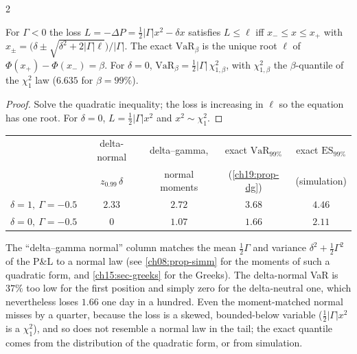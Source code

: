 \begin{paracol}{2}
\begin{proposition}\label{ch19:prop-dg}
For $\Gamma<0$ the loss $L=-\Delta P=\tfrac12|\Gamma|x^2-\delta x$ satisfies $L\le\ell$ iff $x_-\le x\le x_+$ with $x_\pm=\bigl(\delta\pm\sqrt{\delta^2+2|\Gamma|\ell}\bigr)/|\Gamma|$. The exact $\mathrm{VaR}_\beta$ is the unique root $\ell$ of $\Phi(x_+)-\Phi(x_-)=\beta$. For $\delta=0$, $\mathrm{VaR}_\beta=\tfrac12|\Gamma|\,\chi^2_{1,\beta}$, with $\chi^2_{1,\beta}$ the $\beta$-quantile of the $\chi^2_1$ law ($6.635$ for $\beta=99\%$).
\end{proposition}
\begin{proof}
Solve the quadratic inequality; the loss is increasing in $\ell$ so the equation has one root. For $\delta=0$, $L=\frac12|\Gamma|x^2$ and $x^2\sim\chi^2_1$.
\end{proof}
\begin{center}\small
\begin{tabular}{@{}lcccc@{}}
\toprule
& delta-normal & delta--gamma, & exact $\mathrm{VaR}_{99\%}$ & exact $\mathrm{ES}_{99\%}$ \\
& $z_{0.99}\,\delta$ & normal moments & (\cref{ch19:prop-dg}) & (simulation) \\
\midrule
$\delta=1,\ \Gamma=-0.5$ & $2.33$ & $2.72$ & $3.68$ & $4.46$ \\
$\delta=0,\ \Gamma=-0.5$ & $0$ & $1.07$ & $1.66$ & $2.11$ \\
\bottomrule
\end{tabular}
\end{center}
The ``delta--gamma normal'' column matches the mean $\frac12\Gamma$ and variance $\delta^2+\frac12\Gamma^2$ of the P\&L to a normal law (see \cref{ch08:prop-simm} for the moments of such a quadratic form, and \cref{ch15:sec-greeks} for the Greeks). The delta-normal VaR is $37\%$ too low for the first position and simply zero for the delta-neutral one, which nevertheless loses $1.66$ one day in a hundred. Even the moment-matched normal misses by a quarter, because the loss is a skewed, bounded-below variable ($\tfrac12|\Gamma|x^2$ is a $\chi^2_1$), and so does not resemble a normal law in the tail; the exact quantile comes from the distribution of the quadratic form, or from simulation.


\end{paracol}

